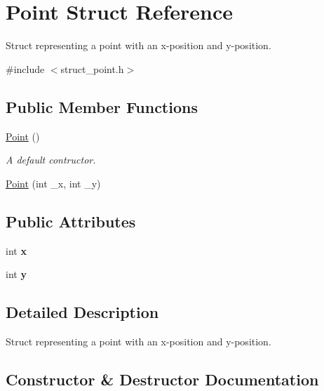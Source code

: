 \hypertarget{structPoint}{}\section{Point Struct Reference}
\label{structPoint}


Struct representing a point with an x-\/position and y-\/position.  




{\ttfamily \#include $<$struct\+\_\+point.\+h$>$}

\subsection*{Public Member Functions}
\begin{DoxyCompactItemize}
\item 
\hyperlink{structPoint_ad92f2337b839a94ce97dcdb439b4325a}{Point} ()
\begin{DoxyCompactList}\small\item\em A default contructor. \end{DoxyCompactList}\item 
\hyperlink{structPoint_acf2d96a374f9b7c9c636ba1a2ad42f02}{Point} (int \+\_\+x, int \+\_\+y)
\end{DoxyCompactItemize}
\subsection*{Public Attributes}
\begin{DoxyCompactItemize}
\item 
\mbox{\label{structPoint_a8c779e11e694b20e0946105a9f5de842}} 
int {\bfseries x}
\item 
\mbox{\label{structPoint_a2e1b5fb2b2a83571f5c0bc0f66a73cf7}} 
int {\bfseries y}
\end{DoxyCompactItemize}


\subsection{Detailed Description}
Struct representing a point with an x-\/position and y-\/position. 

\subsection{Constructor \& Destructor Documentation}
\mbox{\label{structPoint_ad92f2337b839a94ce97dcdb439b4325a}} 
